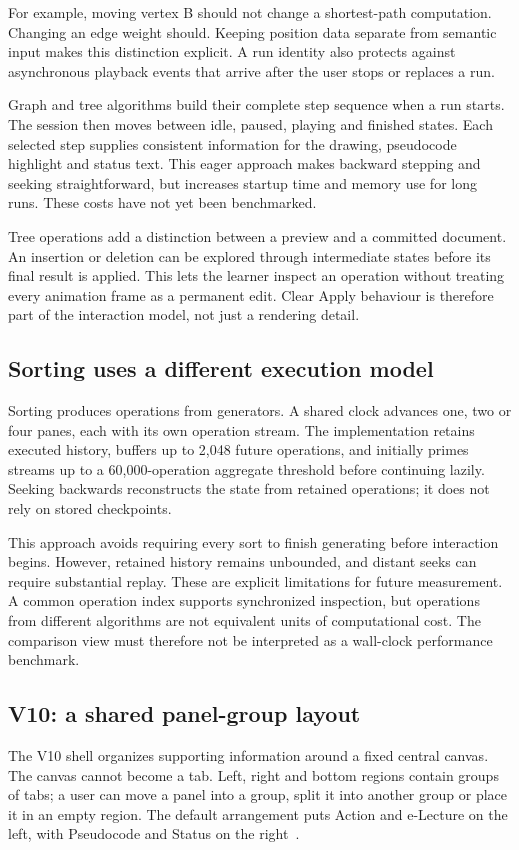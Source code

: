 \documentclass[11pt,a4paper]{article}
\newcommand{\page}{\par\vspace{8pt}}
\begin{document}
For example, moving vertex B should not change a shortest-path computation. Changing an edge weight should. Keeping position data separate from semantic input makes this distinction explicit. A run identity also protects against asynchronous playback events that arrive after the user stops or replaces a run.

Graph and tree algorithms build their complete step sequence when a run starts. The session then moves between idle, paused, playing and finished states. Each selected step supplies consistent information for the drawing, pseudocode highlight and status text. This eager approach makes backward stepping and seeking straightforward, but increases startup time and memory use for long runs. These costs have not yet been benchmarked.

Tree operations add a distinction between a preview and a committed document. An insertion or deletion can be explored through intermediate states before its final result is applied. This lets the learner inspect an operation without treating every animation frame as a permanent edit. Clear Apply behaviour is therefore part of the interaction model, not just a rendering detail.

\subsection{Sorting uses a different execution model}
Sorting produces operations from generators. A shared clock advances one, two or four panes, each with its own operation stream. The implementation retains executed history, buffers up to 2,048 future operations, and initially primes streams up to a 60,000-operation aggregate threshold before continuing lazily. Seeking backwards reconstructs the state from retained operations; it does not rely on stored checkpoints.

This approach avoids requiring every sort to finish generating before interaction begins. However, retained history remains unbounded, and distant seeks can require substantial replay. These are explicit limitations for future measurement. A common operation index supports synchronized inspection, but operations from different algorithms are not equivalent units of computational cost. The comparison view must therefore not be interpreted as a wall-clock performance benchmark.

\page
\subsection{V10: a shared panel-group layout}\label{sec:v10}
The V10 shell organizes supporting information around a fixed central canvas. The canvas cannot become a tab. Left, right and bottom regions contain groups of tabs; a user can move a panel into a group, split it into another group or place it in an empty region. The default arrangement puts Action and e-Lecture on the left, with Pseudocode and Status on the right~\cite{architecture}.
\end{document}
